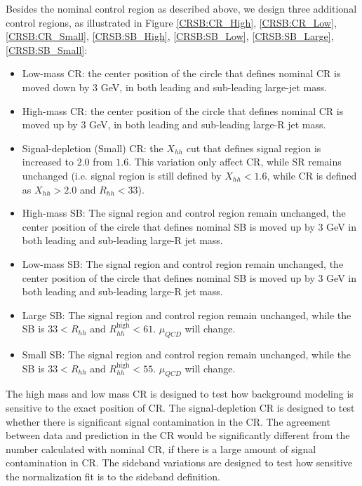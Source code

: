 Besides the nominal control region as described above, we design three additional control regions, as illustrated in Figure \ref{CRSB:CR_High}, \ref{CRSB:CR_Low}, \ref{CRSB:CR_Small}, \ref{CRSB:SB_High}, \ref{CRSB:SB_Low}, \ref{CRSB:SB_Large}, \ref{CRSB:SB_Small}:
\begin{itemize}
	\item Low-mass CR: the center position of the circle that defines nominal CR is moved down by 3 GeV, in both leading and sub-leading large-jet mass.
	\item High-mass CR: the center position of the circle that defines nominal CR is moved up by 3 GeV, in both leading and sub-leading large-R jet mass.
	\item Signal-depletion (Small) CR: the $X_{hh}$ cut that defines signal region is increased to $2.0$ from $1.6$. This variation only affect CR, while SR remains unchanged (i.e. signal region is still defined by $X_{hh}<1.6$, while CR is defined as $X_{hh}>2.0$ and $R_{hh}<33$).
	\item High-mass SB: The signal region and control region remain unchanged, the center position of the circle that defines nominal SB is moved up by 3 GeV in both leading and sub-leading large-R jet mass.
	\item Low-mass SB: The signal region and control region remain unchanged, the center position of the circle that defines nominal SB is moved up by 3 GeV in both leading and sub-leading large-R jet mass.
	\item Large SB: The signal region and control region remain unchanged, while the SB is $33 < R_{hh}$ and $ R_{hh}^{\text{high}} < 61$. $\mu_{QCD}$ will change.
	\item Small SB: The signal region and control region remain unchanged, while the SB is $33 < R_{hh}$ and $ R_{hh}^{\text{high}} < 55$. $\mu_{QCD}$ will change.
\end{itemize}

The high mass and low mass CR is designed to test how background modeling is sensitive to the exact position of CR. The signal-depletion CR is designed to test whether there is significant signal contamination in the CR. The agreement between data and prediction in the CR would be significantly different from the number calculated with nominal CR, if there is a large amount of signal contamination in CR. The sideband variations are designed to test how sensitive the normalization fit is to the sideband definition.

